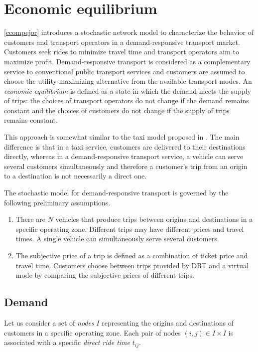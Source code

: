 \documentclass[dissertation,draft*]{aaltoseries}
\begin{document}
\chapter{Economic equilibrium}
\label{economicmodels}
\ref{ccompejor} introduces a stochastic network model to characterize the 
behavior of customers and transport operators in a demand-responsive transport market. 
Customers seek rides to minimize travel time and transport operators aim to maximize profit. 
Demand-responsive transport is considered as a complementary service to conventional public transport services and 
customers are assumed to choose the utility-maximizing alternative from the available transport modes.
An \emph{economic equilibrium} is defined as a state in which the demand meets the supply of trips: 
the choices of transport operators
do not change if the demand remains constant and the choices of customers
do not change if the supply of trips remains constant. 

This approach is somewhat similar to the taxi model proposed in \cite{yang2010}. The main difference is that in a taxi service, 
customers are delivered to their destinations directly, whereas in a demand-responsive transport service, a vehicle can serve several customers 
simultaneously and therefore a customer's trip from an origin to a destination is not necessarily a direct one. 

The stochastic model for demand-responsive transport is governed by the following preliminary assumptions.
\begin{enumerate}
\item
There are $N$ vehicles that produce trips between 
origins and destinations in a specific operating zone. 
Different trips may have different prices and
travel times. A single vehicle can simultaneously serve several customers.
\item
The subjective price of a trip is defined as a combination of ticket price and travel time.
Customers choose between trips provided by 
DRT and a virtual mode by comparing the subjective 
prices of different trips.
\end{enumerate} 


\section{Demand}
\label{demand}
Let us consider a set of \emph{nodes} $I$ representing the origins and destinations of customers in a specific operating zone.
Each pair of nodes $(i,j) \in I \times I$ is associated with a specific \emph{direct ride time} $t_{ij}$.
\end{document}
